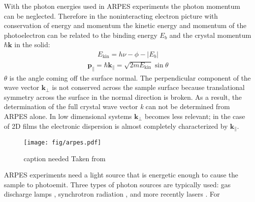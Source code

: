 \documentclass[12pt]{article}
\begin{document}
With the photon energies used in ARPES experiments the photon momentum can be neglected.
Therefore in the noninteracting electron picture with conservation of energy and momentum the kinetic energy and momentum of the photoelectron can be related to the binding energy $E_b$ and the crystal momentum $\hbar\boldsymbol{k}$ in the solid\cite{Damascelli}:
\begin{align}
  E_{\text{kin}}=h\nu-\phi-|E_b|
\end{align}
\begin{align}
  \boldsymbol{p_{\parallel}}=\hbar\boldsymbol{k_{\parallel}}=\sqrt{2mE_{\text{kin}}}\sin\theta
\end{align}
$\theta$ is the angle coming off the surface normal.
The perpendicular component of the wave vector $\boldsymbol{k_{\perp}}$ is not conserved across the sample surface because translational symmetry across the surface in the normal direction is broken.  
As a result, the determination of the full crystal wave vector \emph{k} can not be determined from ARPES alone.
In low dimensional systems $\boldsymbol{k_{\perp}}$ becomes less relevant; in the case of 2D films the electronic dispersion is almost completely characterized by $\boldsymbol{k_{\parallel}}$.

\begin{figure}[h]
  \centering
  \texttt{[image: fig/arpes.pdf]}
  \caption[should I put this here?]
  {caption needed Taken from \cite{Damascelli}}
  \label{fig:asymmetry}
\end{figure}
ARPES experiments need a light source that is energetic enough to cause the sample to photoemit.
Three types of photon sources are typically used:  gas discharge lamps \cite{Damascelli}, synchrotron radiation \cite{Damascelli}, and more recently lasers \cite{Dessau}.
For 
\end{document}
